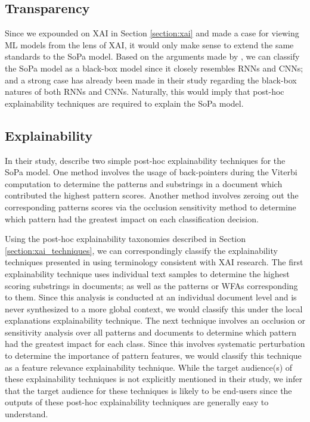 \subsection{Transparency}

\label{section:sopa_transparency}

Since we expounded on XAI in Section \ref{section:xai} and made a case for
viewing ML models from the lens of XAI, it would only make sense to extend the
same standards to the SoPa model. Based on the arguments made by
\citet{arrieta2020explainable}, we can classify the SoPa model as a black-box
model since it closely resembles RNNs and CNNs; and a strong case has already
been made in their study regarding the black-box natures of both RNNs and CNNs.
Naturally, this would imply that post-hoc explainability techniques are required to
explain the SoPa model.

\subsection{Explainability}

\label{section:sopa_post_hoc}

In their study, \citet[Page 7, Section 7]{schwartz2018sopa} describe two simple
post-hoc explainability techniques for the SoPa model. One method involves the
usage of back-pointers during the Viterbi computation to determine the patterns
and substrings in a document which contributed the highest pattern scores.
Another method involves zeroing out the corresponding patterns scores via the
occlusion sensitivity method to determine which pattern had the greatest impact
on each classification decision.

Using the post-hoc explainability taxonomies described in Section
\ref{section:xai_techniques}, we can correspondingly classify the explainability
techniques presented in \citet{schwartz2018sopa} using terminology consistent with
XAI research. The first explainability technique uses individual text samples to
determine the highest scoring substrings in documents; as well as the patterns
or WFAs corresponding to them. Since this analysis is conducted at an individual
document level and is never synthesized to a more global context, we would
classify this under the local explanations explainability technique. The next
technique involves an occlusion or sensitivity analysis over all patterns and
documents to determine which pattern had the greatest impact for each class.
Since this involves systematic perturbation to determine the importance of
pattern features, we would classify this technique as a feature relevance
explainability technique. While the target audience(s) of these
explainability techniques is not explicitly mentioned in their study, we infer that
the target audience for these techniques is likely to be end-users since the
outputs of these post-hoc explainability techniques are generally easy to understand.


